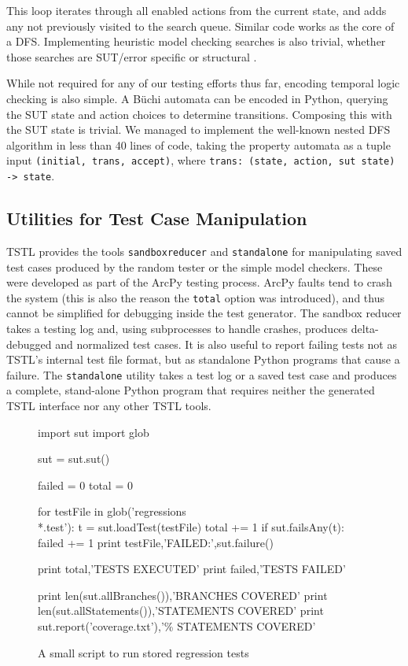This loop iterates through all enabled actions from the current state, and adds any not previously visited to the search queue.  Similar code works as the core of a DFS.  Implementing heuristic model checking searches is also trivial, whether those searches are SUT/error specific \cite{EdelkampHeur} or structural \cite{groce-structural}.

While not required for any of our testing efforts thus far, encoding temporal logic checking is also simple.  A B\"uchi automata can be encoded in Python, querying the SUT state and action choices to determine transitions.  Composing this with the SUT state is trivial.  We managed to implement the well-known nested DFS algorithm \cite{DoubleDFS} in less than 40 lines of code, taking the property automata as a tuple input {\tt(initial, trans, accept)}, where {\tt trans: (state, action, sut state) -> state}.

\subsection{Utilities for Test Case Manipulation}

TSTL provides the tools {\tt sandboxreducer} and {\tt standalone} for manipulating saved test cases produced by the random tester or the simple model checkers.  These were developed as part of the ArcPy testing process.  ArcPy faults tend to crash the system (this is also the reason the {\tt total} option was introduced), and thus cannot be simplified for debugging inside the test generator.   The sandbox reducer takes a testing log and, using subprocesses to handle crashes, produces delta-debugged and normalized test cases. It is also useful to report failing tests not as TSTL's internal test file format, but as standalone Python programs that cause a failure.  The {\tt standalone} utility takes a test log or a saved test case and produces a complete, stand-alone Python program that requires neither the generated TSTL interface nor any other TSTL tools.

\begin{figure}
{\scriptsize
\begin{code}
import sut
import glob

sut = sut.sut()

failed = 0
total = 0

for testFile in glob('regressions\\*.test'):
   t = sut.loadTest(testFile)
   total += 1
   if sut.failsAny(t):
       failed += 1
       print testFile,'FAILED:',sut.failure()

print total,'TESTS EXECUTED'
print failed,'TESTS FAILED'

print len(sut.allBranches()),'BRANCHES COVERED'
print len(sut.allStatements()),'STATEMENTS COVERED'
print sut.report('coverage.txt'),'\% STATEMENTS COVERED'
\end{code}
}
\caption{A small script to run stored regression tests}
\label{fig:regress}
\end{figure}


